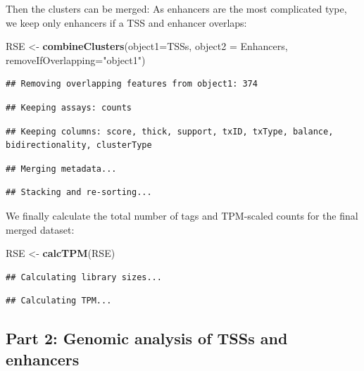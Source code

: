 \documentclass[9pt,a4paper,]{extarticle}
\newenvironment{Shaded}{\begin{snugshade}}{\end{snugshade}}
\newcommand{\KeywordTok}[1]{\textcolor[rgb]{0.13,0.29,0.53}{\textbf{{#1}}}}
\newcommand{\DataTypeTok}[1]{\textcolor[rgb]{0.13,0.29,0.53}{{#1}}}
\newcommand{\StringTok}[1]{\textcolor[rgb]{0.31,0.60,0.02}{{#1}}}
\newcommand{\NormalTok}[1]{{#1}}
\begin{document}
Then the clusters can be merged: As enhancers are the most complicated type, we keep only enhancers if a TSS and enhancer overlaps:

\begin{Shaded}
\begin{Highlighting}[]
\NormalTok{RSE <-}\StringTok{ }\KeywordTok{combineClusters}\NormalTok{(}\DataTypeTok{object1=}\NormalTok{TSSs, }
                       \DataTypeTok{object2 =} \NormalTok{Enhancers, }
                       \DataTypeTok{removeIfOverlapping=}\StringTok{"object1"}\NormalTok{)}
\end{Highlighting}
\end{Shaded}

\begin{verbatim}
## Removing overlapping features from object1: 374
\end{verbatim}

\begin{verbatim}
## Keeping assays: counts
\end{verbatim}

\begin{verbatim}
## Keeping columns: score, thick, support, txID, txType, balance, bidirectionality, clusterType
\end{verbatim}

\begin{verbatim}
## Merging metadata...
\end{verbatim}

\begin{verbatim}
## Stacking and re-sorting...
\end{verbatim}

We finally calculate the total number of tags and TPM-scaled counts for the final merged dataset:

\begin{Shaded}
\begin{Highlighting}[]
\NormalTok{RSE <-}\StringTok{ }\KeywordTok{calcTPM}\NormalTok{(RSE)}
\end{Highlighting}
\end{Shaded}

\begin{verbatim}
## Calculating library sizes...
\end{verbatim}

\begin{verbatim}
## Calculating TPM...
\end{verbatim}

\subsection{Part 2: Genomic analysis of TSSs and enhancers}\label{part-2-genomic-analysis-of-tsss-and-enhancers}
\end{document}
